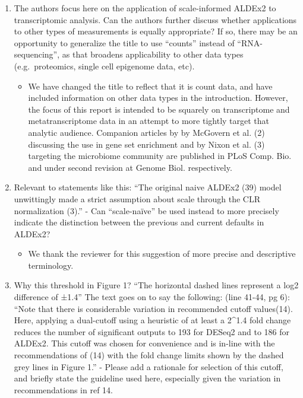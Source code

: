 \documentclass[
]{article}
\providecommand{\tightlist}{%
  \setlength{\itemsep}{0pt}\setlength{\parskip}{0pt}}
\begin{document}
\begin{enumerate}
\def\labelenumi{\arabic{enumi}.}
\item
  The authors focus here on the application of scale-informed ALDEx2 to
  transcriptomic analysis. Can the authors further discuss whether
  applications to other types of measurements is equally appropriate? If
  so, there may be an opportunity to generalize the title to use
  ``counts'' instead of ``RNA-sequencing'', as that broadens
  applicability to other data types (e.g.~proteomics, single cell
  epigenome data, etc).

  \begin{itemize}
  \tightlist
  \item
    We have changed the title to reflect that it is count data, and have
    included information on other data types in the introduction.
    However, the focus of this report is intended to be squarely on
    transcriptome and metatranscriptome data in an attempt to more
    tightly target that analytic audience. Companion articles by by
    McGovern et al. (2) discussing the use in gene set enrichment and by
    Nixon et al. (3) targeting the microbiome community are published in
    PLoS Comp. Bio. and under second revision at Genome Biol.
    respectively.
  \end{itemize}
\item
  Relevant to statements like this: ``The original naive ALDEx2 (39)
  model unwittingly made a strict assumption about scale through the CLR
  normalization (3).'' - Can ``scale-naïve'' be used instead to more
  precisely indicate the distinction between the previous and current
  defaults in ALDEx2?

  \begin{itemize}
  \tightlist
  \item
    We thank the reviewer for this suggestion of more precise and
    descriptive terminology.
  \end{itemize}
\item
  Why this threshold in Figure 1? ``The horizontal dashed lines
  represent a log2 difference of ±1.4'' The text goes on to say the
  following: (line 41-44, pg 6): ``Note that there is considerable
  variation in recommended cutoff values(14). Here, applying a
  dual-cutoff using a heuristic of at least a 2\^{}1.4 fold change
  reduces the number of significant outputs to 193 for DESeq2 and to 186
  for ALDEx2. This cutoff was chosen for convenience and is in-line with
  the recommendations of (14) with the fold change limits shown by the
  dashed grey lines in Figure 1.'' - Please add a rationale for
  selection of this cutoff, and briefly state the guideline used here,
  especially given the variation in recommendations in ref 14.


\end{enumerate}
\end{document}
